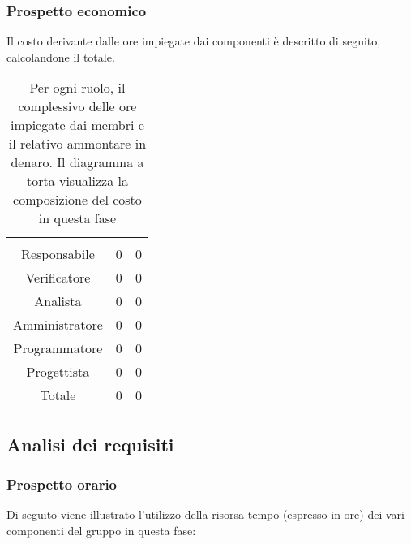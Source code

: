 \subsubsection{Prospetto economico}
Il costo derivante dalle ore impiegate dai componenti è descritto di seguito, calcolandone il totale.

\begin{table}[hbt!]
{\setlength{\parindent}{0cm}
\begin{minipage}{.43\textwidth}
	\begin{tabular}{ccc}
	\rowcolorhead
	\headertitle{Ruolo} & \headertitle{Ore} & \headertitle{Costo(€)}\\
	Responsabile & 0 & 0\\
	Verificatore & 0 & 0\\
	Analista & 0 & 0\\
	Amministratore & 0 & 0\\
	Programmatore & 0 & 0\\
	Progettista & 0 & 0\\
	\hline
	Totale & 0& 0\\
	\end{tabular}
\end{minipage}%
\begin{minipage}{.57\textwidth}
\end{minipage} }
\caption{Per ogni ruolo, il complessivo delle ore impiegate dai membri e il relativo ammontare in denaro. Il diagramma a torta visualizza la composizione del costo in questa fase}
\end{table}



\subsection{Analisi dei requisiti}

\subsubsection{Prospetto orario}
Di seguito viene illustrato l'utilizzo della risorsa tempo (espresso in ore) dei vari componenti del gruppo in questa fase:

